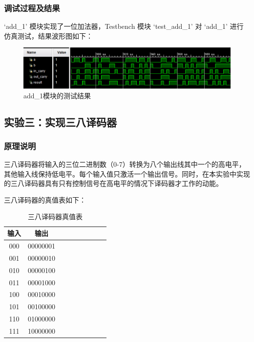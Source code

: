 \documentclass[zihao=5, UTF8]{article}
\theoremstyle{MyLineTheoremStyle} %
\theoremstyle{MyBlockTheoremStyle} %
\theoremstyle{MySubsubsectionStyle} %
\begin{document}
\subsubsection{调试过程及结果}
`add\_1' 模块实现了一位加法器，Testbench 模块 `test\_add\_1' 对 `add\_1' 进行仿真测试，结果波形图如下：
\begin{figure}[htbp]
    \centering
    \includegraphics[width=\textwidth]{add_1.png} %
    \caption{add\_1模块的测试结果}
    \label{fig:add_1模块的测试结果}
\end{figure}


\subsection{实验三：实现三八译码器}
\subsubsection{原理说明}
三八译码器将输入的三位二进制数（0-7）转换为八个输出线其中一个的高电平，其他输入线保持低电平。每个输入值只激活一个输出信号。同时，在本实验中实现的三八译码器具有只有控制信号在高电平的情况下译码器才工作的动能。

三八译码器的真值表如下：
\begin{table}[H]
    \centering
    \caption{三八译码器真值表}
    \begin{tabular}{|c|c|c|c|c|c|c|c|c|}
        \hline
        输入 & 输出 \\
        \hline
        000 & 00000001 \\
        001 & 00000010 \\
        010 & 00000100 \\
        011 & 00001000 \\
        100 & 00010000 \\
        101 & 00100000 \\
        110 & 01000000 \\
        111 & 10000000 \\
        \hline
    \end{tabular}
\end{table}
\end{document}
